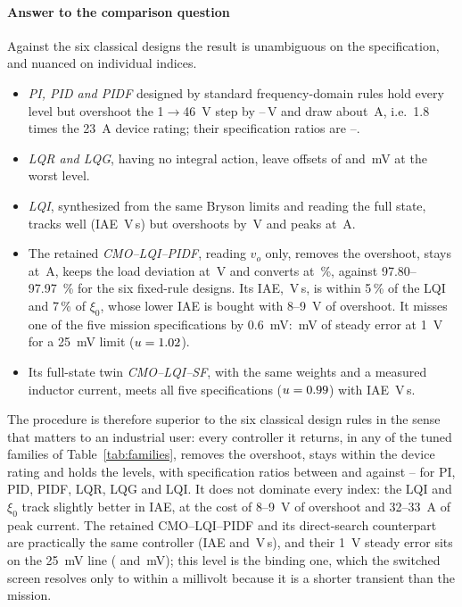 \paragraph{Answer to the comparison question}
Against the six classical designs the result is unambiguous on the
specification, and nuanced on individual indices.
\begin{itemize}
\item \emph{PI, PID and PIDF} designed by standard frequency-domain rules hold
  every level but overshoot the 1$\to$46~V step by \SwPIOS--\SwPIDFOS{}\,V and
  draw about \SwPIIpk{}\,A, i.e.\ 1.8 times the \SI{23}{A} device rating;
  their specification ratios are \SwPIUtil--\SwPIDFUtil.
\item \emph{LQR and LQG}, having no integral action, leave offsets of
  \SwLQREss{} and \SwLQGEss{}\,mV at the worst level.
\item \emph{LQI}, synthesized from the same Bryson limits and reading the full
  state, tracks well (IAE \SwLQIIAE{}\,V\,s) but overshoots by \SwLQIOS{}\,V and
  peaks at \SwLQIIpk{}\,A.
\item The retained \emph{CMO--LQI--PIDF}, reading $v_o$ only, removes the
  overshoot, stays at \SwIpk{}\,A, keeps the load deviation at \SwLD{}\,V and
  converts at \SwEta{}\,\%, against 97.80--\SI{97.97}{\percent} for the six
  fixed-rule designs. Its IAE, \SwIAE{}\,V\,s, is within 5\,\% of the LQI and 7\,\% of
  $\xi_0$, whose lower IAE is bought with 8--\SI{9}{V} of overshoot. It misses
  one of the five mission specifications by \SI{0.6}{mV}: \SwEss{}\,mV of
  steady error at \SI{1}{V} for a \SI{25}{mV} limit ($u=1.02$).
\item Its full-state twin \emph{CMO--LQI--SF}, with the same weights and a
  measured inductor current, meets all five specifications ($u=0.99$) with
  IAE \SwSFIAE{}\,V\,s.
\end{itemize}
The procedure is therefore superior to the six classical design rules in the
sense that matters to an industrial user: every controller it returns, in any of
the tuned families of Table~\ref{tab:families}, removes the overshoot, stays
within the device rating and holds the levels, with specification ratios between
\SwPIdUtil{} and \SwUtil{} against \SwLQIUtil--\SwLQRUtil{} for PI, PID, PIDF,
LQR, LQG and LQI. It does not dominate every index: the LQI and $\xi_0$ track
slightly better in IAE, at the cost of 8--\SI{9}{V} of overshoot and
32--\SI{33}{A} of peak current. The retained CMO--LQI--PIDF and its
direct-search counterpart are practically the same controller (IAE \SwIAE{}
and \SwPIDFdIAE{}\,V\,s), and their \SI{1}{V} steady error sits on the \SI{25}{mV} line
(\SwEss{} and \SwPIDFdEss{}\,mV); this level is the binding one, which the
switched screen resolves only to within a millivolt because it is a shorter
transient than the mission.

